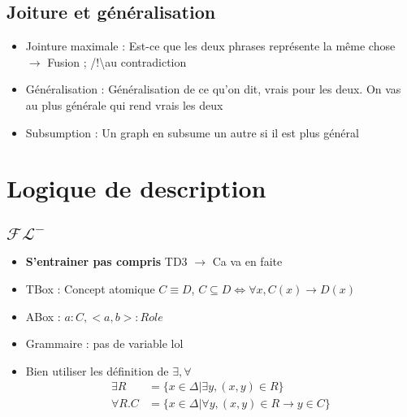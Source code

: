\documentclass{article}
\theoremstyle{plain}%
\theoremstyle{definition}
\theoremstyle{remark}
\begin{document}
\subsection{Joiture et généralisation}
\begin{itemize}
    \item Jointure maximale : Est-ce que les deux phrases représente la même chose $\rightarrow$ Fusion ; /!\textbackslash au contradiction
    \item Généralisation : Généralisation de ce qu'on dit, vrais pour les deux. On vas au plus générale qui rend vrais les deux
    \item Subsumption : Un graph en subsume un autre si il est plus général
\end{itemize}

\section{Logique de description}
\subsection{$ \mathcal{FL}^- $ }
\begin{itemize}
    \item \textbf{S'entrainer pas compris} TD3 $\rightarrow$ Ca va en faite
    \item TBox : Concept atomique $ C \equiv D $, $ C \subseteq D \Leftrightarrow \forall x, C(x) \to D(x)$ 
    \item ABox : $ a : C, <a,b> : Role $ 
    \item Grammaire : pas de variable lol
    \item Bien utiliser les définition de $ \exists , \forall  $ \begin{align*}
        \exists R &= \{x \in \Delta | \exists y, (x,y) \in R\} \\
        \forall R.C &= \{x \in \Delta | \forall y, (x,y) \in R \to y \in C \}
    \end{align*}
\end{itemize}
\end{document}

